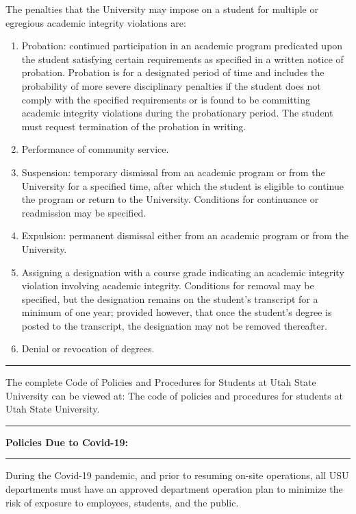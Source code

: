 \documentclass[10pt,fleqn]{article}
\begin{document}
The penalties that the University may impose on a student for multiple or
egregious academic integrity violations are:
\begin{enumerate}
  \item Probation: continued participation in an academic program predicated
        upon the student satisfying certain requirements as specified in a
        written notice of probation. Probation is for a designated period of
        time and includes the probability of more severe disciplinary penalties
        if the student does not comply with the specified requirements or is
        found to be committing academic integrity violations during the
        probationary period. The student must request termination of the
        probation in writing.
  \item Performance of community service.
  \item Suspension: temporary dismissal from an academic program or from the
        University for a specified time, after which the student is eligible to
        continue the program or return to the University. Conditions for
        continuance or readmission may be specified.
  \item Expulsion: permanent dismissal either from an academic program or from
        the University.
  \item Assigning a designation with a course grade indicating an academic
        integrity violation involving academic integrity. Conditions for removal
        may be specified, but the designation remains on the student's
        transcript for a minimum of one year; provided however, that once the
        student's degree is posted to the transcript, the designation may not be
        removed thereafter.
  \item Denial or revocation of degrees.
\end{enumerate}
\vskip0.1in\hrule\vskip0.1in\noindent
The complete Code of Policies and Procedures for Students at Utah State
University can be viewed at: The code of policies and procedures for students at
Utah State University.
\vskip0.1in\hrule\vskip0.1in
\noindent
{\bf Policies Due to Covid-19:}
\vskip0.1in\hrule\vskip0.1in \noindent
During the Covid-19 pandemic, and prior to resuming on-site operations, all USU
departments must have an approved department operation plan to minimize the
risk of exposure to employees, students, and the public. 
\end{document}
